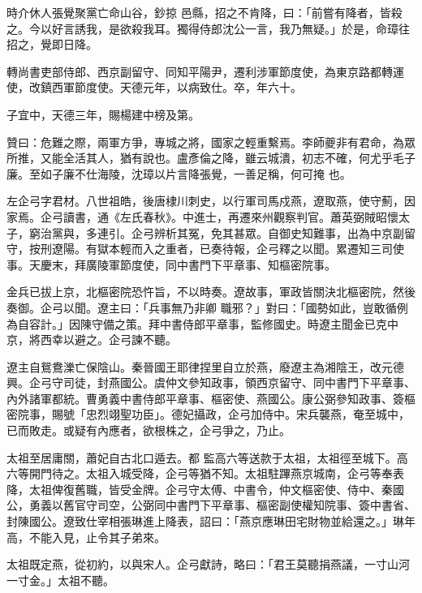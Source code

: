 \begin{pinyinscope}
 時介休人張覺聚黨亡命山谷，鈔掠
 邑縣，招之不肯降，曰：「前嘗有降者，皆殺之。今以好言誘我，是欲殺我耳。獨得侍郎沈公一言，我乃無疑。」於是，命璋往招之，覺即日降。



 轉尚書吏部侍郎、西京副留守、同知平陽尹，遷利涉軍節度使，為東京路都轉運使，改鎮西軍節度使。天德元年，以病致仕。卒，年六十。



 子宜中，天德三年，賜楊建中榜及第。



 贊曰：危難之際，兩軍方爭，專城之將，國家之輕重繫焉。李師夔非有君命，為眾所推，又能全活其人，猶有說也。盧彥倫之降，雖云城潰，初志不確，何尤乎毛子廉。至如子廉不仕海陵，沈璋以片言降張覺，一善足稱，何可掩
 也。



 左企弓字君材。八世祖皓，後唐棣川刺史，以行軍司馬戍燕，遼取燕，使守薊，因家焉。企弓讀書，通《左氏春秋》。中進士，再遷來州觀察判官。蕭英弼賊昭懷太子，窮治黨與，多連引。企弓辨析其冤，免其甚眾。自御史知難事，出為中京副留守，按刑遼陽。有獄本輕而入之重者，已奏待報，企弓釋之以聞。累遷知三司使事。天慶末，拜廣陵軍節度使，同中書門下平章事、知樞密院事。



 金兵已拔上京，北樞密院恐忤旨，不以時奏。遼故事，軍政皆關決北樞密院，然後奏御。企弓以聞。遼主曰：「兵事無乃非卿
 職邪？」對曰：「國勢如此，豈敢循例為自容計。」因陳守備之策。拜中書侍郎平章事，監修國史。時遼主聞金已克中京，將西幸以避之。企弓諫不聽。



 遼主自鴛鴦濼亡保陰山。秦晉國王耶律捏里自立於燕，廢遼主為湘陰王，改元德興。企弓守司徒，封燕國公。虞仲文參知政事，領西京留守、同中書門下平章事、內外諸軍都統。曹勇義中書侍郎平章事、樞密使、燕國公。康公弼參知政事、簽樞密院事，賜號「忠烈翊聖功臣」。德妃攝政，企弓加侍中。宋兵襲燕，奄至城中，已而敗走。或疑有內應者，欲根株之，企弓爭之，乃止。



 太祖至居庸關，蕭妃自古北口遁去。都
 監高六等送款于太祖，太祖徑至城下。高六等開門待之。太祖入城受降，企弓等猶不知。太祖駐蹕燕京城南，企弓等奉表降，太祖俾復舊職，皆受金牌。企弓守太傅、中書令，仲文樞密使、侍中、秦國公，勇義以舊官守司空，公弼同中書門下平章事、樞密副使權知院事、簽中書省、封陳國公。遼致仕宰相張琳進上降表，詔曰：「燕京應琳田宅財物並給還之。」琳年高，不能入見，止令其子弟來。



 太祖既定燕，從初約，以與宋人。企弓獻詩，略曰：「君王莫聽捐燕議，一寸山河一寸金。」太祖不聽。




\end{pinyinscope}
